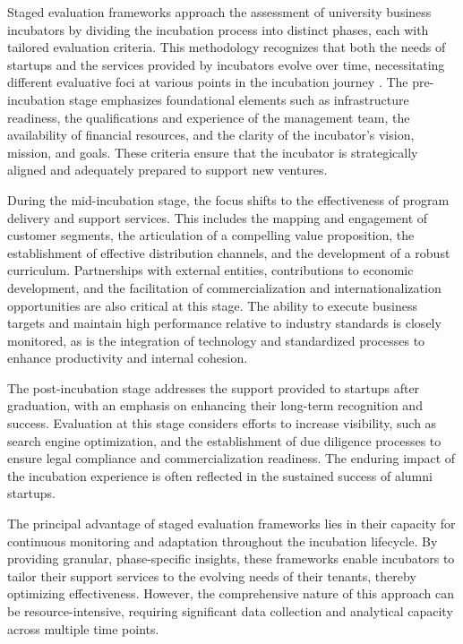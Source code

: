 \documentclass[../Main.tex]{subfiles}
\begin{document}
Staged evaluation frameworks approach the assessment of university business incubators by dividing the incubation process into distinct phases, each with tailored evaluation criteria. This methodology recognizes that both the needs of startups and the services provided by incubators evolve over time, necessitating different evaluative foci at various points in the incubation journey \cite{Amelia_EvaluationFramework}. The pre-incubation stage emphasizes foundational elements such as infrastructure readiness, the qualifications and experience of the management team, the availability of financial resources, and the clarity of the incubator's vision, mission, and goals. These criteria ensure that the incubator is strategically aligned and adequately prepared to support new ventures.

During the mid-incubation stage, the focus shifts to the effectiveness of program delivery and support services. This includes the mapping and engagement of customer segments, the articulation of a compelling value proposition, the establishment of effective distribution channels, and the development of a robust curriculum. Partnerships with external entities, contributions to economic development, and the facilitation of commercialization and internationalization opportunities are also critical at this stage. The ability to execute business targets and maintain high performance relative to industry standards is closely monitored, as is the integration of technology and standardized processes to enhance productivity and internal cohesion.

The post-incubation stage addresses the support provided to startups after graduation, with an emphasis on enhancing their long-term recognition and success. Evaluation at this stage considers efforts to increase visibility, such as search engine optimization, and the establishment of due diligence processes to ensure legal compliance and commercialization readiness. The enduring impact of the incubation experience is often reflected in the sustained success of alumni startups.

The principal advantage of staged evaluation frameworks lies in their capacity for continuous monitoring and adaptation throughout the incubation lifecycle. By providing granular, phase-specific insights, these frameworks enable incubators to tailor their support services to the evolving needs of their tenants, thereby optimizing effectiveness. However, the comprehensive nature of this approach can be resource-intensive, requiring significant data collection and analytical capacity across multiple time points.
\end{document}
